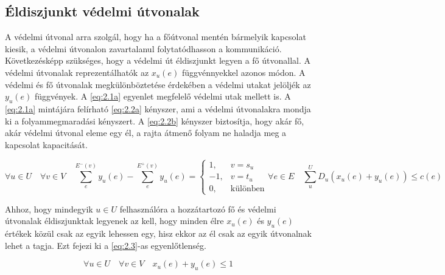 \documentclass[a4paper,oneside]{article}
\newcommand{\inedge}[1]{E^-(#1)}
\newcommand{\outedge}[1]{E^+(#1)}
\begin{document}
\subsection{Éldiszjunkt védelmi útvonalak}
\label{sec:edgedisjunct}

A védelmi útvonal arra szolgál, hogy ha a főútvonal mentén bármelyik kapcsolat kiesik,
a védelmi útvonalon zavartalanul folytatódhasson a kommunikáció.
Következésképp szükséges, hogy a védelmi út éldiszjunkt legyen a fő útvonallal.
A védelmi útvonalak reprezentálhatók az $x_u(e)$ függvénnyekkel azonos módon.
A védelmi és fő útvonalak megkülönböztetése érdekében a védelmi utakat jelöljék az $y_u(e)$ függvények.
A \eqref{eq:2.1a} egyenlet megfelelő védelmi utak mellett is.
A \eqref{eq:2.1a} mintájára felírható \eqref{eq:2.2a} kényszer,
ami a védelmi útvonalakra mondja ki a folyammegmaradási kényszert.
A \eqref{eq:2.2b} kényszer biztosítja, hogy akár fő, akár védelmi útvonal eleme egy él,
a rajta átmenő folyam ne haladja meg a kapcsolat kapacitását.

\begin{subequations}
  \begin{equation}
    \forall u \in U \quad \forall v \in V \quad \sum_{e}^{\inedge{v}}y_u(e) - \sum_{e}^{\outedge{v}}y_u(e) = \begin{cases}
      1, & v = s_u \\
      -1, & v = t_u\\
      0, & \text{különben}
    \end{cases} \label{eq:2.2a}
  \end{equation}
  \begin{equation}
    \forall e \in E \quad \sum_{u}^{U} D_u \left( x_u(e) + y_u(e) \right) \leq c(e) \label{eq:2.2b}
  \end{equation}
\end{subequations}

\newpage

Ahhoz, hogy mindegyik $u \in U$ felhasználóra a hozzátartozó fő és védelmi útvonalak éldiszjunktak legyenek az kell,
hogy minden élre $x_u(e)$ és $y_u(e)$ értékek közül csak az egyik lehessen egy,
hisz ekkor az él csak az egyik útvonalnak lehet a tagja. Ezt fejezi ki a \eqref{eq:2.3}-as egyenlőtlenség.

\begin{equation}
  \forall u \in U \quad \forall v \in V \quad x_u(e) + y_u(e) \leq 1 \label{eq:2.3}
\end{equation}
\end{document}
